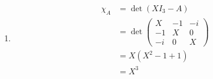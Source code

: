 \documentclass[a4paper,12pt]{article}
\begin{document}
\begin{enumerate}[label=\alph*)]
    \begin{align*}
        S^{-1} A S &= S^{-1} \begin{pmatrix}
                1 & 0 & 7 \\
                0 & 1 & 0 \\
                7 & 0 & 1
              \end{pmatrix}\begin{pmatrix}
                1 & 0 & 1 \\
                0 & 1 & 0 \\
                1 & 0 & -1
              \end{pmatrix} \\
            &= \begin{pmatrix}
                \tfrac{1}{2} & 0 & \tfrac{1}{2} \\
                0 & 1 & 0 \\
                \tfrac{1}{2} & 0 & -\tfrac{1}{2}
              \end{pmatrix}\begin{pmatrix}
                8 & 0 & -6 \\
                0 & 1 & 0 \\
                8 & 0 & 6
              \end{pmatrix} \\
            &= \begin{pmatrix}
                8 & 0 & 0 \\
                0 & 1 & 0 \\
                0 & 0 & -6
              \end{pmatrix}
            = \begin{pmatrix}
                1+7 & 0 & 0 \\
                0 & 1 & 0 \\
                0 & 0 & 1-7
              \end{pmatrix}
    \end{align*}

    \item
    \begin{align*}
        \chi_A &= \det(XI_3 - A) \\
               &= \det\begin{pmatrix}
                    X  & -1 & -i \\
                    -1 & X  & 0 \\
                    -i & 0  & X
                  \end{pmatrix} \\
               &= X(X^2 - 1 + 1) \\
               &= X^3
    \end{align*}


\end{enumerate}
\end{document}
